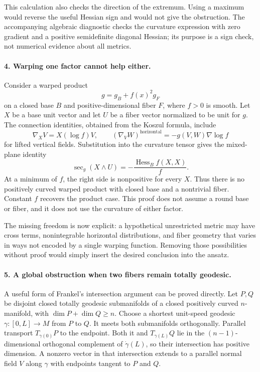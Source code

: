 \documentclass[11pt]{article}
\begin{document}
This calculation also checks the direction of the extremum. Using a maximum would reverse the useful Hessian sign and would not give the obstruction. The accompanying algebraic diagnostic checks the curvature expression with zero gradient and a positive semidefinite diagonal Hessian; its purpose is a sign check, not numerical evidence about all metrics.

\paragraph{4. Warping one factor cannot help either.}
Consider a warped product
\[
 g=g_B+f(x)^2g_F
\]
on a closed base $B$ and positive-dimensional fiber $F$, where $f>0$ is smooth. Let $X$ be a base unit vector and let $U$ be a fiber vector normalized to be unit for $g$. The connection identities, obtained from the Koszul formula, include
\[
 \nabla_XV=X(\log f)V,
 \qquad (\nabla_VW)^{\mathrm{horizontal}}
 =-g(V,W)\nabla\log f
\]
for lifted vertical fields. Substitution into the curvature tensor gives the mixed-plane identity
\[
 \sec_g(X\wedge U)=-\frac{\operatorname{Hess}_B f(X,X)}{f}.
\]
At a minimum of $f$, the right side is nonpositive for every $X$. Thus there is no positively curved warped product with closed base and a nontrivial fiber. Constant $f$ recovers the product case. This proof does not assume a round base or fiber, and it does not use the curvature of either factor.

The missing freedom is now explicit: a hypothetical unrestricted metric may have cross terms, nonintegrable horizontal distributions, and fiber geometry that varies in ways not encoded by a single warping function. Removing those possibilities without proof would simply insert the desired conclusion into the ansatz.

\paragraph{5. A global obstruction when two fibers remain totally geodesic.}
A useful form of Frankel's intersection argument can be proved directly. Let $P,Q$ be disjoint closed totally geodesic submanifolds of a closed positively curved $n$-manifold, with $\dim P+\dim Q\geq n$. Choose a shortest unit-speed geodesic $\gamma:[0,L]\to M$ from $P$ to $Q$. It meets both submanifolds orthogonally. Parallel transport $T_{\gamma(0)}P$ to the endpoint. Both it and $T_{\gamma(L)}Q$ lie in the $(n-1)$-dimensional orthogonal complement of $\dot\gamma(L)$, so their intersection has positive dimension. A nonzero vector in that intersection extends to a parallel normal field $V$ along $\gamma$ with endpoints tangent to $P$ and $Q$.
\end{document}
